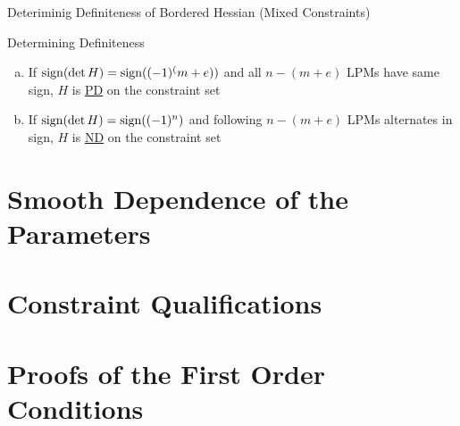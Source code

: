 \documentclass[final]{beamer}
\begin{document}
\begin{frame}[t]{Deteriminig Definiteness of Bordered Hessian (Mixed Constraints)}
	\begin{block}{Determining Definiteness}
		\begin{enumerate}[(a)]
			\item If ${\rm sign}(\det H)={\rm sign}((-1)^(m+e))$ and all $n-(m+e)$ LPMs have same sign, $H$ is \uline{PD} on the constraint set
			\item If ${\rm sign}(\det H)={\rm sign}((-1)^n)$ and following $n-(m+e)$ LPMs alternates in sign, $H$ is \uline{ND} on the constraint set 
		\end{enumerate}
	\end{block}
\end{frame}

\section{Smooth Dependence of the Parameters} %
\label{sec:smooth_dependence_of_the_parameters}


\section{Constraint Qualifications} %
\label{sec:constraint_qualifications}


\section{Proofs of the First Order Conditions} %
\label{sec:proofs_of_the_first_order_conditions}

\end{document}

